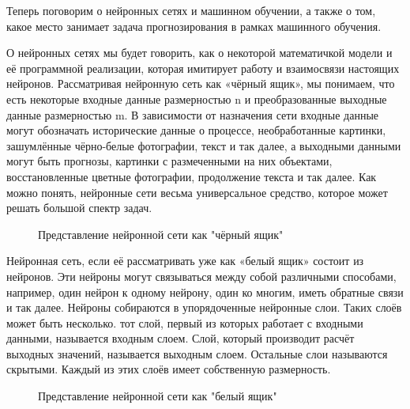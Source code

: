 {\cyrillicfont 
\fontsize{13pt}{16.25pt}\selectfont 
\englishfont 

  \par \redline Теперь поговорим о нейронных сетях и машинном обучении, а также о том, какое место занимает задача прогнозирования в рамках машинного обучения. 

  \par \redline О нейронных сетях мы будет говорить, как о некоторой математичкой модели и её программной реализации, которая имитирует работу и взаимосвязи настоящих нейронов.  Рассматривая нейронную сеть как «чёрный ящик», мы понимаем, что есть некоторые входные данные размерностью n и преобразованные выходные данные размерностью m. В зависимости от назначения сети входные данные могут обозначать исторические данные о процессе, необработанные картинки, зашумлённые чёрно-белые фотографии, текст и так далее, а выходными данными могут быть прогнозы, картинки с размеченными на них объектами, восстановленные цветные фотографии, продолжение текста и так далее. Как можно понять, нейронные сети весьма универсальное средство, которое может решать большой спектр задач. 

  \begin{figure}
    \centering
    \def\svgwidth{\textwidth}
    
    \caption{Представление нейронной сети как "чёрный ящик"}
    \label{fig:NNBlackBox}
  \end{figure}

  \par \redline Нейронная сеть, если её рассматривать уже как «белый ящик» состоит из нейронов. Эти нейроны могут связываться между собой различными способами, например, один нейрон к одному нейрону, один ко многим, иметь обратные связи и так далее. Нейроны собираются в упорядоченные нейронные слои. Таких слоёв может быть несколько. тот слой, первый из которых работает с входными данными, называется входным слоем. Слой, который производит расчёт выходных значений, называется выходным слоем. Остальные слои называются скрытыми. Каждый из этих слоёв имеет собственную размерность. 

  \begin{figure}
    \centering
    \def\svgwidth{\textwidth}
    
    \caption{Представление нейронной сети как "белый ящик"}
    \label{fig:NNWhiteBox}
  \end{figure}

}
